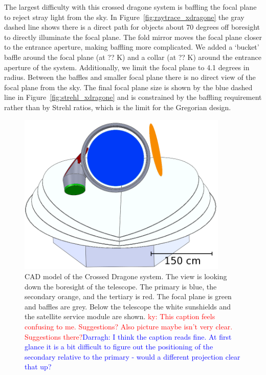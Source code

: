 \documentclass[11pt,a4paper]{article}
\newcommand{\comred}[1]{\textcolor{red}{#1}}
\newcommand{\comblue}[1]{\textcolor{blue}{#1}}
\begin{document}
The largest difficulty with this crossed dragone system is baffling the focal plane to reject stray light 
from the sky.  In Figure~\ref{fig:raytrace_xdragone} the gray dashed line shows there is a direct path 
for objects about 70 degrees off boresight to directly illuminate the focal plane.  The fold mirror moves 
the focal plane closer to the entrance aperture, making baffling more complicated.  We added a `bucket' 
baffle around the focal plane (at ?? K) and a collar (at ?? K) around the entrance aperture of the system.  Additionally, we 
limit the focal plane to 4.1 degrees in radius.  Between the baffles and smaller focal plane there is no 
direct view of the focal plane from the sky.  The final focal plane size is shown by the blue dashed line 
in Figure~\ref{fig:strehl_xdragone} and is constrained by the baffling requirement rather than by Strehl 
ratios, which is the limit for the Gregorian design.

\begin{figure}[htbp] %
	\centering
	\includegraphics[width=10cm]{full_xdragone.png} 
	\caption{CAD model of the Crossed Dragone system.  The view is looking down the boresight of the telescope. The 
		primary is blue, the secondary orange, and the tertiary is red.  The focal plane is green and baffles are grey.
		Below the telescope the white sunshields and the satellite service module are shown.
		\comred{ky: This caption feels confusing to me. Suggestions? Also picture maybe isn't very clear. Suggestions there?}\comblue{Darragh: I think the caption reads fine. At first glance it is a bit difficult to figure out the positioning of the secondary relative to the primary - would a different projection clear that up?}
	}
	\label{fig:full_xdragone}
\end{figure}
\end{document}
